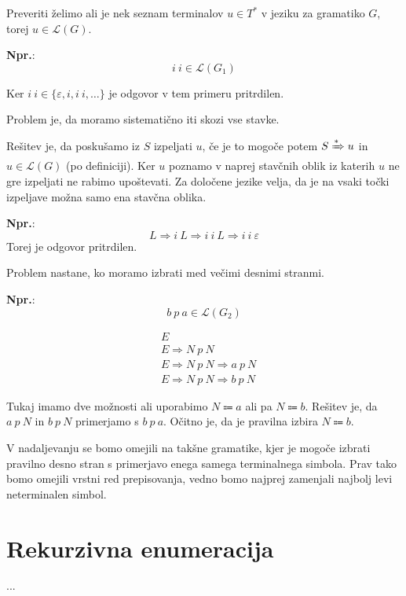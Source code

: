 \documentclass{article}
\newcommand{\Ex}{\textbf{Npr.}:\ }
\newcommand{\Grammar}{G}
\newcommand{\StartSymbol}{S}
\newcommand{\Null}{\varepsilon}
\newcommand{\Language}[1]{\mathcal{L}(#1)}
\newcommand{\Arrow}{\Coloneqq}
\newcommand{\Derive}{\Rightarrow}
\newcommand{\DeriveStar}{\xRightarrow{\ast}}
\newcommand{\Seq}{\ }
\newcommand{\Kleene}[1]{#1^\ast}
\begin{document}
Preveriti želimo ali je nek seznam terminalov $u \in \Kleene{T}$ v jeziku za gramatiko $\Grammar$, torej $u \in \Language{\Grammar}$.

\Ex
  \begin{equation*}
    i \Seq i \in \Language{\Grammar_1}
  \end{equation*}

  Ker $i \Seq i \in \{\Null, i, i \Seq i, \dots\}$ je odgovor v tem primeru pritrdilen.

Problem je, da moramo sistematično iti skozi vse stavke.

Rešitev je, da poskušamo iz $\StartSymbol$ izpeljati $u$, če je to mogoče potem $\StartSymbol \DeriveStar u$ in $u \in \Language{\Grammar}$ (po definiciji).
Ker $u$ poznamo v naprej stavčnih oblik iz katerih $u$ ne gre izpeljati ne rabimo upoštevati.
Za določene jezike velja, da je na vsaki točki izpeljave možna samo ena stavčna oblika.

\Ex
  \begin{equation*}
    L \Derive i \Seq L \Derive i \Seq i \Seq L \Derive i \Seq i \Seq \Null
  \end{equation*}
  Torej je odgovor pritrdilen.

Problem nastane, ko moramo izbrati med večimi desnimi stranmi.

\Ex
  \begin{equation*}
    b \Seq p \Seq a \in \Language{\Grammar_2}
  \end{equation*}

  \begin{align*}
    &E \\
    &E \Derive N \Seq p \Seq N \\
    &E \Derive N \Seq p \Seq N \Derive a \Seq p \Seq N\\
    &E \Derive N \Seq p \Seq N \Derive b \Seq p \Seq N
  \end{align*}

Tukaj imamo dve možnosti ali uporabimo $N \Arrow a$ ali pa $N \Arrow b$.
Rešitev je, da $a \Seq p \Seq N$ in $b \Seq p \Seq N$ primerjamo s $b \Seq p \Seq a$.
Očitno je, da je pravilna izbira $N \Arrow b$.

V nadaljevanju se bomo omejili na takšne gramatike, kjer je mogoče izbrati pravilno desno stran s primerjavo enega samega terminalnega simbola.
Prav tako bomo omejili vrstni red prepisovanja, vedno bomo najprej zamenjali najbolj levi neterminalen simbol.

\section{Rekurzivna enumeracija}
...
\end{document}
